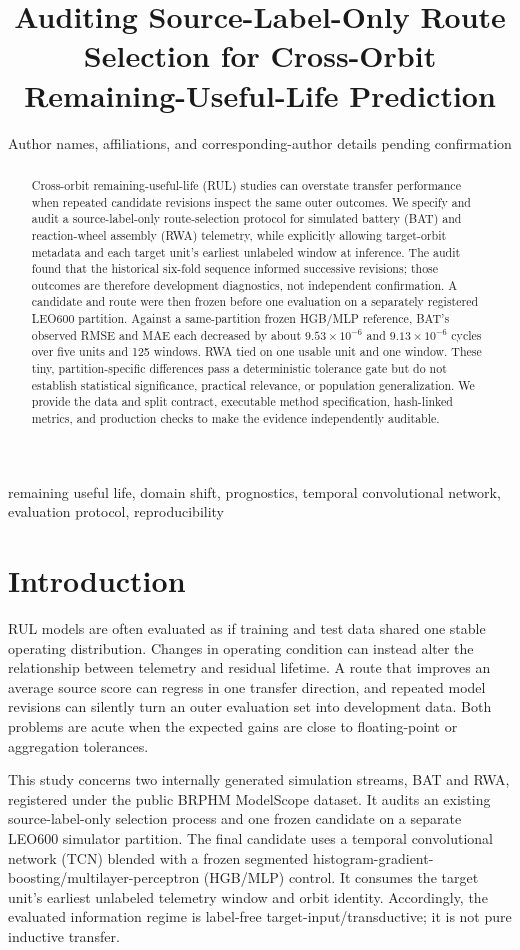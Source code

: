 \documentclass[journal]{IEEEtran}
\title{Auditing Source-Label-Only Route Selection for Cross-Orbit Remaining-Useful-Life Prediction}
\author{Author names, affiliations, and corresponding-author details pending confirmation}
\begin{document}
\maketitle

\begin{abstract}
Cross-orbit remaining-useful-life (RUL) studies can overstate transfer performance when repeated candidate revisions inspect the same outer outcomes. We specify and audit a source-label-only route-selection protocol for simulated battery (BAT) and reaction-wheel assembly (RWA) telemetry, while explicitly allowing target-orbit metadata and each target unit's earliest unlabeled window at inference. The audit found that the historical six-fold sequence informed successive revisions; those outcomes are therefore development diagnostics, not independent confirmation. A candidate and route were then frozen before one evaluation on a separately registered LEO600 partition. Against a same-partition frozen HGB/MLP reference, BAT's observed RMSE and MAE each decreased by about $9.53\times10^{-6}$ and $9.13\times10^{-6}$ cycles over five units and 125 windows. RWA tied on one usable unit and one window. These tiny, partition-specific differences pass a deterministic tolerance gate but do not establish statistical significance, practical relevance, or population generalization. We provide the data and split contract, executable method specification, hash-linked metrics, and production checks to make the evidence independently auditable.
\end{abstract}
\begin{IEEEkeywords}
remaining useful life, domain shift, prognostics, temporal convolutional network, evaluation protocol, reproducibility
\end{IEEEkeywords}

\section{Introduction}
RUL models are often evaluated as if training and test data shared one stable operating distribution. Changes in operating condition can instead alter the relationship between telemetry and residual lifetime. A route that improves an average source score can regress in one transfer direction, and repeated model revisions can silently turn an outer evaluation set into development data. Both problems are acute when the expected gains are close to floating-point or aggregation tolerances.

This study concerns two internally generated simulation streams, BAT and RWA, registered under the public BRPHM ModelScope dataset. It audits an existing source-label-only selection process and one frozen candidate on a separate LEO600 simulator partition. The final candidate uses a temporal convolutional network (TCN) blended with a frozen segmented histogram-gradient-boosting/multilayer-perceptron (HGB/MLP) control. It consumes the target unit's earliest unlabeled telemetry window and orbit identity. Accordingly, the evaluated information regime is label-free target-input/transductive; it is not pure inductive transfer.
\end{document}
